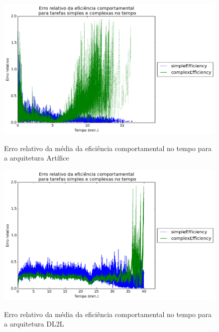 \begin{apendicesenv}
\begin{figure}[H]
    \centering
    \caption{Erro relativo da média da eficiência comportamental no tempo para a arquitetura Artífice}
    \includegraphics[scale=0.6]{04-figuras/experiments/exp_1_artifice/behaviouralEfficiency_err.png}
    \label{fig:behEfficiency_artifice_err}
\end{figure}

\begin{figure}[H]
    \centering
    \caption{Erro relativo da média da eficiência comportamental no tempo para a arquitetura DL2L}
    \includegraphics[scale=0.6]{04-figuras/experiments/exp_1_l2l/behaviouralEfficiency_err.png}
    \label{fig:behEfficiency_dl2l_err}
\end{figure}


\end{apendicesenv}
